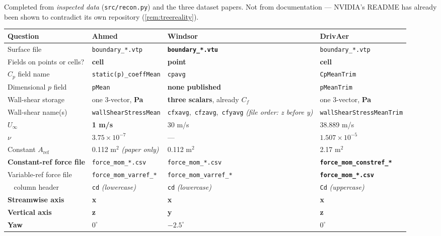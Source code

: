 \documentclass[10pt,a4paper]{article}
\theoremstyle{definition}
\DeclareMathOperator{\Cd}{C_d}
\newcommand{\Cp}{{C_p}}
\newcommand{\Cf}{{C_f}}
\begin{document}
Completed from \emph{inspected data} (\texttt{src/recon.py}) and the three dataset
papers. Not from documentation --- NVIDIA's README has already been shown to
contradict its own repository (\cref{rem:treereality}).

\begin{center}\footnotesize
\begin{tabular}{@{}p{3.5cm}p{3.4cm}p{3.4cm}p{3.4cm}@{}}
\toprule
\textbf{Question} & \textbf{Ahmed} & \textbf{Windsor} & \textbf{DrivAer} \\
\midrule
Surface file & \texttt{boundary\_*.vtp} & \textbf{\texttt{boundary\_*.vtu}} & \texttt{boundary\_*.vtp} \\
Fields on points or cells? & \textbf{cell} & \textbf{point} & \textbf{cell} \\
$\Cp$ field name & \texttt{static(p)\_coeffMean} & \texttt{cpavg} & \texttt{CpMeanTrim} \\
Dimensional $p$ field & \texttt{pMean} & \textbf{none published} & \texttt{pMeanTrim} \\
Wall-shear storage & one 3-vector, \textbf{Pa} & \textbf{three scalars}, already $\Cf$ & one 3-vector, \textbf{Pa} \\
Wall-shear name(s) & \texttt{wallShearStressMean} & \texttt{cfxavg},\ \texttt{cfzavg},\ \texttt{cfyavg} \emph{(file order: z before y)} & \texttt{wallShearStress\-MeanTrim} \\
$U_\infty$ & \textbf{1 m/s} & 30 m/s & 38.889 m/s \\
$\nu$ & $3.75\times10^{-7}$ & --- & $1.507\times10^{-5}$ \\
Constant $A_{\text{ref}}$ & 0.112 m$^2$ \emph{(paper only)} & 0.112 m$^2$ & 2.17 m$^2$ \\
\textbf{Constant-ref force file} & \texttt{force\_mom\_*.csv} & \texttt{force\_mom\_*.csv} & \textbf{\texttt{force\_mom\_constref\_*}} \\
Variable-ref force file & \texttt{force\_mom\_varref\_*} & \texttt{force\_mom\_varref\_*} & \textbf{\texttt{force\_mom\_*.csv}} \\
$\Cd$ column header & \texttt{cd} \emph{(lowercase)} & \texttt{cd} \emph{(lowercase)} & \texttt{Cd} \emph{(uppercase)} \\
\textbf{Streamwise axis} & \textbf{x} & \textbf{x} & \textbf{x} \\
\textbf{Vertical axis} & \textbf{z} & \textbf{y} & \textbf{z} \\
\textbf{Yaw} & $0^\circ$ & $\mathbf{-2.5^\circ}$ & $0^\circ$ \\
\bottomrule
\end{tabular}
\end{center}
\end{document}
